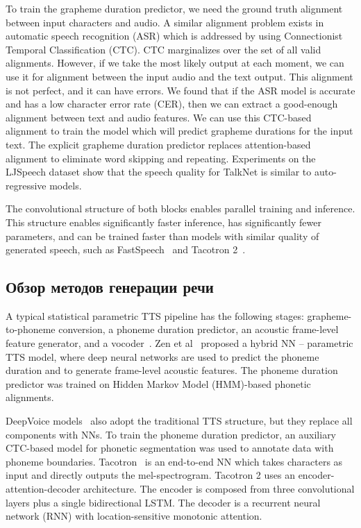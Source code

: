 To train the grapheme duration predictor, we need the ground truth alignment between input characters and audio. A similar alignment problem exists in automatic speech recog\-nition (ASR) which is addressed by using Connectionist Temporal Classification (CTC). CTC marginalizes over the set of all valid alignments. However, if we take the most likely output at each moment, we can use it for alignment between the input audio and the text output. This alignment is not perfect, and it can have errors. We found that if the ASR model is accurate and has a low character error rate (CER), then we can extract a good-enough alignment between text and audio features. We can use this CTC-based alignment to train the model which will predict grapheme durations for the input text. The explicit grapheme duration predictor replaces attention-based alignment to eliminate word skipping and repeating. Experiments on the LJSpeech dataset show that the speech quality for TalkNet is similar to auto-regressive models.

The convolutional structure of both blocks enables parallel training and inference. This structure enables significantly faster inference, has significantly fewer parameters, and can be trained faster than models with similar quality of generated speech, such as FastSpeech~\cite{fastspeech} and Tacotron 2~\cite{tacotron2}.

\subsection{Обзор методов генерации речи}

A typical statistical parametric TTS pipeline has the following stages: grapheme-to-phoneme conversion, a phoneme duration predictor, an acoustic frame-level feature generator, and a vocoder~\cite{taylor}. Zen et al~\cite{zen-2015,zen-2016} proposed a hybrid NN -- parametric TTS model, where deep neural networks are used to predict the phoneme duration and to generate frame-level acoustic features. The phoneme duration predictor was trained on Hidden Markov Model (HMM)-based phonetic alignments.  

DeepVoice models~\cite{deepvoice1,deepvoice2} also adopt the traditional TTS structure, but they replace all components with NNs. To train the phoneme duration predictor, an auxiliary CTC-based model for phonetic segmentation was used to annotate  data with phoneme boundaries. Tacotron~\cite{tacotron1,tacotron2} is an end-to-end NN which takes characters as input and directly outputs the mel-spectrogram. Tacotron 2 uses an encoder-attention-decoder architecture. The encoder is composed from three convolutional layers plus a single bidirectional LSTM. The decoder is a recurrent neural network (RNN) with location-sensitive monotonic attention.

